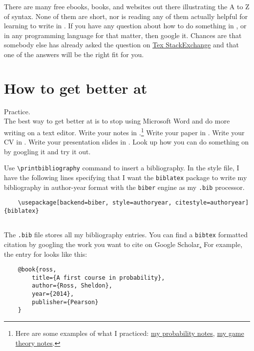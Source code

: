 \documentclass[12pt, notitlepage]{article}
\begin{document}
There are many free ebooks, books, and websites out there illustrating the A to Z of \latex syntax. None of them are short, nor is reading any of them actually helpful for learning to write in \latex. If you have any question about how to do something in \latex, or in any programming language for that matter, then google it. Chances are that somebody else has already asked the question on \href{https://tex.stackexchange.com/}{Tex StackExchange} and that one of the answers will be the right fit for you.

\section{How to get better at \latex}

{\LARGE Practice.}\\

The best way to get better at \latex is to stop using Microsoft Word and do more writing on a \latex text editor. Write your notes in \latex.\footnote{Here are some examples of what I practiced: \href{https://drive.google.com/file/d/0B1KGXZttjtvpZ21OeTE2RW4xLUU/view?usp=sharing}{my probability notes},  \href{https://drive.google.com/drive/folders/0B1KGXZttjtvpd2xHaU9WcFN2OFk}{my game theory notes}.} Write your paper in \latex. Write your CV in \latex. Write your presentation slides in \latex. Look up how you can do something on \latex by googling it and try it out. 


\newpage




\begin{notes}
Use \verb|\printbibliography| command to insert a bibliography. In the style file, I have the following lines specifying that I want the \texttt{biblatex} package to write my bibliography in author-year format with the  \texttt{biber} engine as my \texttt{.bib} processor.
	\begin{verbatim}
	\usepackage[backend=biber, style=authoryear, citestyle=authoryear]{biblatex}
	
	\end{verbatim}
The \texttt{.bib} file stores all my bibliography entries. You can find a \texttt{bibtex} formatted citation by googling the work you want to cite on {Google Scholar}\href{https://scholar.google.com/}. For example, the entry for \cite{ross} looks like this:
	\begin{verbatim}
	@book{ross,
  		title={A first course in probability},
  		author={Ross, Sheldon},
  		year={2014},
  		publisher={Pearson}
	}
	\end{verbatim}
\end{notes}

\printbibliography
\end{document}
